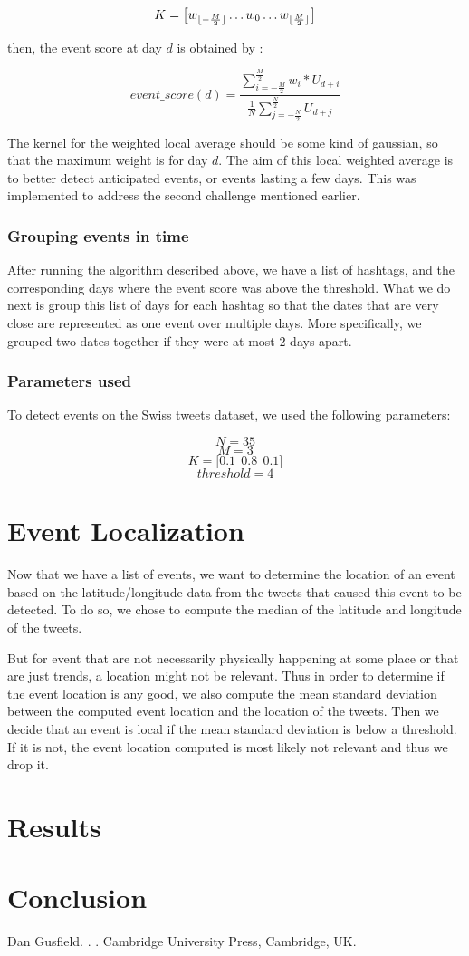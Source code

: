 \documentclass[11pt]{article}
\DeclarePairedDelimiter\floor{\lfloor}{\rfloor}
\begin{document}
$$ K = \big[ w_{ \floor{ -\frac{M}{2} } }  \dots w_{0}  \dots  w_{ \floor{ \frac{M}{2} } } \big] $$

then, the event score at day $d$ is obtained by :

$$ 
event\_score(d) =  \frac {\sum_{i=-\frac{M}{2}}^{\frac{M}{2}} w_i * U_{d + i} }
				    {\frac{1}{N} \sum_{j=-\frac{N}{2}}^{\frac{N}{2}}  U_{d + j} }
$$

The kernel for the weighted local average should be some kind of gaussian, so that the maximum weight is for day $d$. The aim of this local weighted average is to better detect anticipated events, or events lasting a few days. This was implemented to address the second challenge mentioned earlier. 

\subsubsection{Grouping events in time}
After running the algorithm described above, we have a list of hashtags, and the corresponding days where the event score was above the threshold. What we do next is group this list of days for each hashtag so that the dates that are very close are represented as one event over multiple days. More specifically, we grouped two dates together if they were at most 2 days apart.

\subsubsection{Parameters used}
To detect events on the Swiss tweets dataset, we used the following parameters:

$$N = 35 $$
$$M = 3$$
$$K = \big[ 0.1\ \ 0.8\ \ 0.1 \big]$$
$$threshold = 4$$

\section{Event Localization}
Now that we have a list of events, we want to determine the location of an event based on the latitude/longitude data from the tweets that caused this event to be detected. To do so, we chose to compute the median of the latitude and longitude of the tweets. 

But for event that are not necessarily physically happening at some place or that are just trends, a location might not be relevant. Thus in order to determine if the event location is any good, we also compute the mean standard deviation between the computed event location and the location of the tweets. Then we decide that an event is local if the mean standard deviation is below a threshold. If it is not, the event location computed is most likely not relevant and thus we drop it.

\section{Results}

\section{Conclusion}

\begin{thebibliography}{}

Dan Gusfield.
.
.
\newblock Cambridge University Press, Cambridge, UK.

\end{thebibliography}
\end{document}
